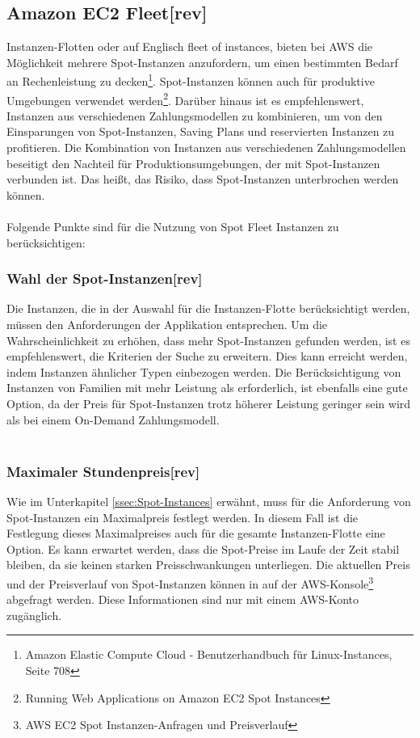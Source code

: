 \subsection{Amazon EC2 Fleet[rev]} \label{sssec:AWS-EC2-Fleet}
Instanzen-Flotten oder auf Englisch fleet of instances, bieten bei AWS die Möglichkeit mehrere Spot-Instanzen anzufordern, um einen bestimmten Bedarf an Rechenleistung zu decken\footnote{\cite{AMZ26} Amazon Elastic Compute Cloud - Benutzerhandbuch für Linux-Instances, Seite 708}. Spot-Instanzen können auch für produktive Umgebungen verwendet werden\footnote{\cite{AMZ24} Running Web Applications on Amazon EC2 Spot Instances}. Darüber hinaus ist es empfehlenswert, Instanzen aus verschiedenen Zahlungsmodellen zu kombinieren, um von den Einsparungen von Spot-Instanzen, Saving Plans und reservierten Instanzen zu profitieren. Die Kombination von Instanzen aus verschiedenen Zahlungsmodellen beseitigt den Nachteil für Produktionsumgebungen, der mit Spot-Instanzen verbunden ist. Das heißt, das Risiko, dass Spot-Instanzen unterbrochen werden können.
\\\\
Folgende Punkte sind für die Nutzung von Spot Fleet Instanzen zu berücksichtigen:
\subsubsection*{Wahl der Spot-Instanzen[rev]}
Die Instanzen, die in der Auswahl für die Instanzen-Flotte berücksichtigt werden, müssen den Anforderungen der Applikation entsprechen. Um die Wahrscheinlichkeit zu erhöhen, dass mehr Spot-Instanzen gefunden werden, ist es empfehlenswert, die Kriterien der Suche zu erweitern. Dies kann erreicht werden, indem Instanzen ähnlicher Typen einbezogen werden. Die Berücksichtigung von Instanzen von Familien mit mehr Leistung als erforderlich, ist ebenfalls eine gute Option\cite{AMZ24}, da der Preis für Spot-Instanzen trotz höherer Leistung geringer sein wird als bei einem On-Demand Zahlungsmodell.
\\\\
\subsubsection*{Maximaler Stundenpreis[rev]}
Wie im Unterkapitel \ref{ssec:Spot-Instances} erwähnt, muss für die Anforderung von Spot-Instanzen ein Maximalpreis festlegt werden. In diesem Fall ist die Festlegung dieses Maximalpreises auch für die gesamte Instanzen-Flotte eine Option. Es kann erwartet werden, dass die Spot-Preise im Laufe der Zeit stabil bleiben, da sie keinen starken Preisschwankungen unterliegen. Die aktuellen Preis und der Preisverlauf von Spot-Instanzen können in auf der AWS-Konsole\footnote{\cite{AMZ25} AWS EC2 Spot Instanzen-Anfragen und Preisverlauf} abgefragt werden. Diese Informationen sind nur mit einem AWS-Konto zugänglich.
\\
